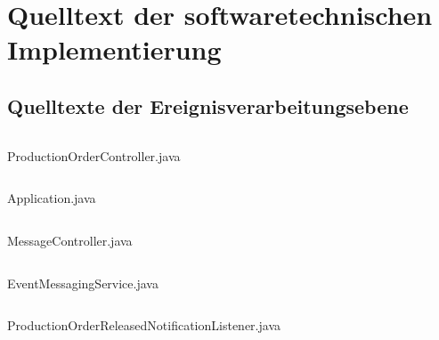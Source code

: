 \chapter{Quelltext der softwaretechnischen Implementierung}\label{ah:coding}

\tocless\section{Quelltexte der Ereignisverarbeitungsebene}\label{ah:approuter}

\begin{algorithm}[H]
\centering 
\inputminted[linenos]{java}{code/ProductionOrderController.java}
\caption{ProductionOrderController.java}
\label{code:EventMessagingService.java}
\end{algorithm}

\begin{algorithm}[H]
\centering 
\inputminted[linenos]{java}{code/Application.java}
\caption{Application.java}
\label{code:Application.java}
\end{algorithm}

\begin{algorithm}[H]
\centering 
\inputminted[linenos]{java}{code/MessageController.java}
\caption{MessageController.java}
\label{code:MessageController.java}
\end{algorithm}

\begin{algorithm}[H]
\centering 
\inputminted[linenos]{java}{code/EventMessagingService.java}
\caption{EventMessagingService.java}
\label{code:EventMessagingService.java}
\end{algorithm}

\begin{algorithm}[H]
\centering 
\inputminted[linenos]{java}{code/ProductionOrderReleasedNotificationListener.java}
\caption{ProductionOrderReleasedNotificationListener.java}
\label{code:EventMessagingService.java}
\end{algorithm}




